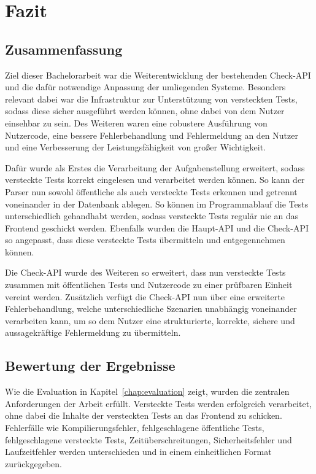 \chapter{Fazit}
\label{chap:fazit}
\section{Zusammenfassung}
Ziel dieser Bachelorarbeit war die Weiterentwicklung der bestehenden Check-API und die dafür notwendige Anpassung der umliegenden Systeme. Besonders relevant dabei war die Infrastruktur zur Unterstützung von versteckten Tests, sodass diese sicher ausgeführt werden können, ohne dabei von dem Nutzer einsehbar zu sein. Des Weiteren waren eine robustere Ausführung von Nutzercode, eine bessere Fehlerbehandlung und Fehlermeldung an den Nutzer und eine Verbesserung der Leistungsfähigkeit von großer Wichtigkeit.

Dafür wurde als Erstes die Verarbeitung der Aufgabenstellung erweitert, sodass versteckte Tests korrekt eingelesen und verarbeitet werden können. So kann der Parser nun sowohl öffentliche als auch versteckte Tests erkennen und getrennt voneinander in der Datenbank ablegen. So können im Programmablauf die Tests unterschiedlich gehandhabt werden, sodass versteckte Tests regulär nie an das Frontend geschickt werden. Ebenfalls wurden die Haupt-API und die Check-API so angepasst, dass diese versteckte Tests übermitteln und entgegennehmen können.

Die Check-API wurde des Weiteren so erweitert, dass nun versteckte Tests zusammen mit öffentlichen Tests und Nutzercode zu einer prüfbaren Einheit vereint werden. Zusätzlich verfügt die Check-API nun über eine erweiterte Fehlerbehandlung, welche unterschiedliche Szenarien unabhängig voneinander verarbeiten kann, um so dem Nutzer eine strukturierte, korrekte, sichere und aussagekräftige Fehlermeldung zu übermitteln.

\section{Bewertung der Ergebnisse}
Wie die Evaluation in Kapitel~\ref{chap:evaluation} zeigt, wurden die zentralen Anforderungen der Arbeit erfüllt. Versteckte Tests werden erfolgreich verarbeitet, ohne dabei die Inhalte der versteckten Tests an das Frontend zu schicken. Fehlerfälle wie Kompilierungsfehler, fehlgeschlagene öffentliche Tests, fehlgeschlagene versteckte Tests, Zeitüberschreitungen, Sicherheitsfehler und Laufzeitfehler werden unterschieden und in einem einheitlichen Format zurückgegeben.

